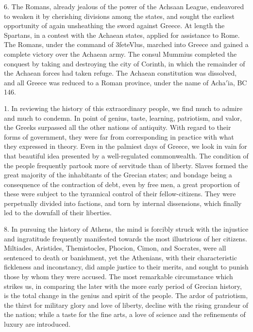 \documentclass[openany,a4paper]{memoir}
\begin{document}
6. The Romans, already jealous of the power of the Achsaan 
League, endeavored to weaken it by cherishing divisions 
among the states, and sought the earliest opportunity of 
again unsheathing the sword against Greece. At length the 
Spartans, in a contest with the Achaean states, applied for 
assistance to Rome. The Romans, under the command of 
3feteVlus, marched into Greece and gained a complete victory 
over the Achaean army. The consul Mummius completed 
the conquest by taking and destroying the city of Corinth, 
in which the remainder of the Achaean forces had taken refuge. The Achaean constitution was dissolved, and all Greece 
was reduced to a Roman province, under the name of Acha$'$ia, 
BC 146. 

1. In reviewing the history of this extraordinary people, 
we find much to admire and much to condemn. In point of 
genius, taste, learning, patriotism, and valor, the Greeks surpassed all the other nations of antiquity. With regard to 
their forms of government, they were far from corresponding 
in practice with what they expressed in theory. Even in 
the palmiest days of Greece, we look in vain for that beautiful idea presented by a well-regulated commonwealth. The 
condition of the people frequently partook more of servitude 
than of liberty. Slaves formed the great majority of the 
inhabitants of the Grecian states; and bondage being a consequence of the contraction of debt, even by free men, a 
great proportion of these were subject to the tyrannical control of their fellow-citizens. They were perpetually divided 
into factions, and torn by internal dissensions, which finally 
led to the downfall of their liberties. 

8. In pursuing the history of Athens, the mind is forcibly 
struck with the injustice and ingratitude frequently manifested towards the most illustrious of her citizens. Miltiades, Aristides, Themistocles, Phocion, Cimon, and Socrates, 
were all sentenced to death or banishment, yet the Athenians, 
with their characteristic fickleness and inconstancy, did ample justice to their merits, and sought to punish those by 
whom they were accused. The most remarkable circumstance 
which strikes us, in comparing the later with the more early 
period of Grecian history, is the total change in the genius 
and spirit of the people. The ardor of patriotism, the thirst 
for military glory and love of liberty, decline with the rising 
grandeur of the nation; while a taste for the fine arts, a love 
of science and the refinements of luxury are introduced. 
\end{document}
